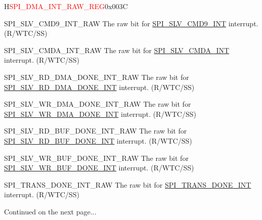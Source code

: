 \begin{register}{H}{\textcolor{red}{SPI\_DMA\_INT\_RAW\_REG}}{0x{}003C}
\begin{regdesc}
\begin{reglist}
\label{fielddesc:SPISLVCMD9INTRAW}\item [SPI\_SLV\_CMD9\_INT\_RAW] The raw bit for \hyperref[int:SPISLVCMD9INT]{SPI\_SLV\_CMD9\_INT} interrupt. (R/WTC/SS)
\label{fielddesc:SPISLVCMDAINTRAW}\item [SPI\_SLV\_CMDA\_INT\_RAW] The raw bit for \hyperref[int:SPISLVCMDAINT]{SPI\_SLV\_CMDA\_INT} interrupt. (R/WTC/SS)
\label{fielddesc:SPISLVRDDMADONEINTRAW}\item [SPI\_SLV\_RD\_DMA\_DONE\_INT\_RAW] The raw bit for \hyperref[int:SPISLVRDDMADONEINT]{SPI\_SLV\_RD\_DMA\_DONE\_INT} interrupt. (R/WTC/SS)
\label{fielddesc:SPISLVWRDMADONEINTRAW}\item [SPI\_SLV\_WR\_DMA\_DONE\_INT\_RAW] The raw bit for \hyperref[int:SPISLVWRDMADONEINT]{SPI\_SLV\_WR\_DMA\_DONE\_INT} interrupt. (R/WTC/SS)
\label{fielddesc:SPISLVRDBUFDONEINTRAW}\item [SPI\_SLV\_RD\_BUF\_DONE\_INT\_RAW] The raw bit for \hyperref[int:SPISLVRDBUFDONEINT]{SPI\_SLV\_RD\_BUF\_DONE\_INT} interrupt. (R/WTC/SS)
\label{fielddesc:SPISLVWRBUFDONEINTRAW}\item [SPI\_SLV\_WR\_BUF\_DONE\_INT\_RAW] The raw bit for \hyperref[int:SPISLVWRBUFDONEINT]{SPI\_SLV\_WR\_BUF\_DONE\_INT} interrupt. (R/WTC/SS)
\label{fielddesc:SPITRANSDONEINTRAW}\item [SPI\_TRANS\_DONE\_INT\_RAW] The raw bit for \hyperref[int:SPITRANSDONEINT]{SPI\_TRANS\_DONE\_INT} interrupt. (R/WTC/SS)

\item [Continued on the next page...]
\end{reglist}\end{regdesc}
\end{register}


